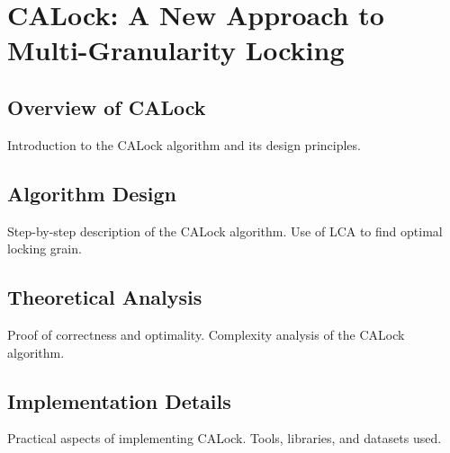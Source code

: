 
\chapter{CALock: A New Approach to Multi-Granularity Locking}
\section{Overview of CALock}
Introduction to the CALock algorithm and its design principles.

\section{Algorithm Design}
Step-by-step description of the CALock algorithm. Use of LCA to find optimal locking grain.

\section{Theoretical Analysis}
Proof of correctness and optimality. Complexity analysis of the CALock algorithm.

\section{Implementation Details}
Practical aspects of implementing CALock. Tools, libraries, and datasets used.
